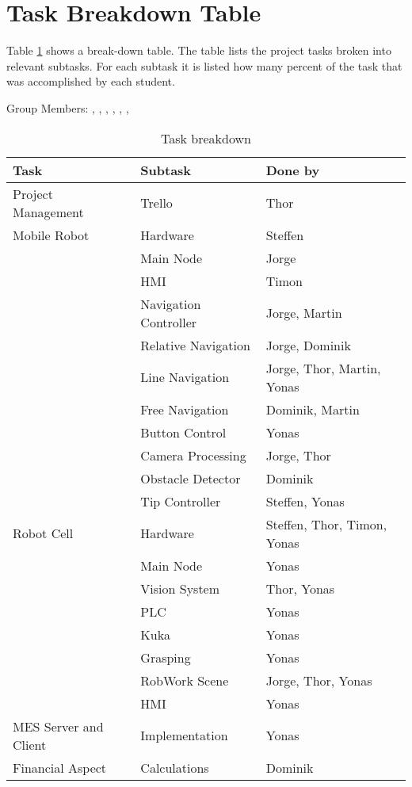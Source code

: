 \section{Task Breakdown Table \label{sec:tasks}}

Table \ref{tab:taks_breakdown} shows a break-down table. The table lists the project tasks broken into relevant subtasks. For each subtask it is listed how many percent of the task that was accomplished by each student.

\newpage 
Group Members: \authorOne, \authorTwo, \authorThree, \authorFour, \authorFive, \authorSix, \authorSeven

\begin{table}[!h]
\centering
\begin{tabular}{lll}
\textbf{Task} & \textbf{Subtask} & \textbf{Done by} \\ \hline
Project Management     & Trello & Thor        \\ \hline
Mobile Robot & Hardware & Steffen        \\ \hline
 & Main Node & Jorge        \\ \hline
 & HMI & Timon        \\ \hline 
 & Navigation Controller & Jorge, Martin       \\ \hline 
 & Relative Navigation & Jorge, Dominik        \\ \hline
 & Line Navigation & Jorge, Thor, Martin, Yonas   \\ \hline
 & Free Navigation & Dominik, Martin      \\ \hline
 & Button Control & Yonas        \\ \hline
 & Camera Processing & Jorge, Thor      \\ \hline
 & Obstacle Detector & Dominik        \\ \hline 
 & Tip Controller & Steffen, Yonas        \\ \hline 
Robot Cell & Hardware & Steffen, Thor, Timon, Yonas \\ \hline
 & Main Node & Yonas        \\ \hline
 & Vision System & Thor, Yonas       \\ \hline
 & PLC & Yonas        \\ \hline
 & Kuka & Yonas      \\ \hline
 & Grasping & Yonas        \\ \hline
 & RobWork Scene & Jorge, Thor, Yonas         \\ \hline
 & HMI & Yonas         \\ \hline
MES Server and Client & Implementation & Yonas        \\ \hline
Financial Aspect & Calculations & Dominik        \\ \hline
\end{tabular}
\caption{Task breakdown}
\label{tab:taks_breakdown}
\end{table}